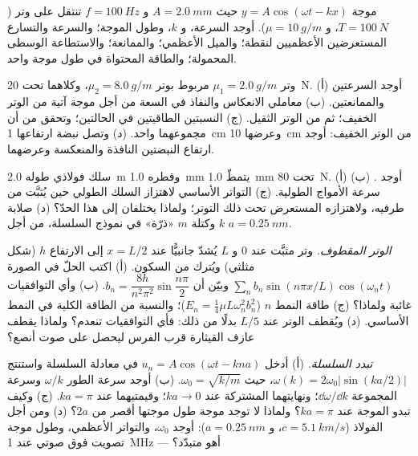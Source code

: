 \begin{exercise}[$\star\star$]\label{exo:b2:waves-on-strings:7}
موجة $y = A\cos(\omega t - kx)$ حيث $A = \qty{2.0}{mm}$ و $f = \qty{100}{Hz}$
تنتقل على وتر ($T = \qty{100}{N}$، و $\mu = \qty{10}{g/m}$). أوجد السرعة، و $k$،
وطول الموجة؛ والسرعة والتسارع المستعرضين الأعظميين لنقطة؛
والميل الأعظمي؛ والممانعة؛ والاستطاعة الوسطى المحمولة؛ والطاقة
المحتواة في طول موجة واحد.
\end{exercise}

\begin{exercise}[$\star\star$]\label{exo:b2:waves-on-strings:8}
وتر $\mu_1 = \qty{2.0}{g/m}$ مربوط بوتر $\mu_2 = \qty{8.0}{g/m}$،
وكلاهما تحت \qty{20}{N}. (أ) أوجد السرعتين والممانعتين. (ب) معاملي
الانعكاس والنفاذ في السعة من أجل موجة آتية من الوتر
الخفيف؛ ثم من الوتر الثقيل. (ج) النسبتين الطاقيتين في الحالتين؛
وتحقق من أن مجموعهما واحد. (د) وتصل نبضة ارتفاعها \qty{1}{cm} وعرضها \qty{10}{cm}
من الوتر الخفيف: أوجد ارتفاع النبضتين النافذة والمنعكسة وعرضهما.
\end{exercise}

\begin{exercise}[$\star\star$]\label{exo:b2:waves-on-strings:9}
سلك فولاذي طوله \qty{2.0}{m} وقطره \qty{1.0}{mm} يتمطّ \qty{1.0}{mm}
تحت \qty{80}{N}. (أ) أوجد . (ب) سرعة الأمواج الطولية.
(ج) التواتر الأساسي لاهتزاز السلك الطولي حين يُثبَّت من
طرفيه، ولاهتزازه المستعرض تحت ذلك التوتر؛ ولماذا يختلفان إلى
هذا الحدّ؟ (د) صلابة $k$ وكتلة $m$ «ذرّة» في نموذج السلسلة،
من أجل $a = \qty{0.25}{nm}$.
\end{exercise}

\begin{exercise}[$\star\star\star$]\label{exo:b2:waves-on-strings:10}
\emph{الوتر المقطوف.} وتر مثبَّت عند $0$ و $L$ يُشدّ جانبيًّا
عند $x = L/2$ إلى الارتفاع $h$ (شكل مثلثي) ويُترك من السكون.
(أ) اكتب الحلّ في الصورة $\sum_nb_n\sin(n\pi x/L)\cos(\omega_nt)$ وبيّن
أن $b_n = \dfrac{8h}{n^2\pi^2}\sin\dfrac{n\pi}2$. (ب) وأي التوافقيات
غائبة ولماذا؟ (ج) طاقة النمط $n$ ($E_n = \tfrac14\mu L\omega_n^2b_n^2$)؛
والنسبة من الطاقة الكلية في النمط الأساسي. (د) ويُقطف الوتر عند
$L/5$ بدلًا من ذلك: فأي التوافقيات تنعدم؟ ولماذا يقطف عازف القيثارة
قرب الفرس ليحصل على صوت أنصع؟
\end{exercise}

\begin{exercise}[$\star\star\star$]\label{exo:b2:waves-on-strings:11}
\emph{تبدد السلسلة.} (أ) أدخل $u_n = A\cos(\omega t - kna)$ في
معادلة السلسلة واستنتج $\omega(k) = 2\omega_0|\sin(ka/2)|$، حيث $\omega_0 =
\sqrt{k/m}$. (ب) أوجد سرعة الطور $\omega/k$ وسرعة المجموعة $\dd\omega/\dd k$؛
ونهايتهما المشتركة عند $ka \to 0$؛ وقيمتيهما عند $ka = \pi$. (ج) وكيف
تبدو الموجة عند $ka = \pi$؟ ولماذا لا توجد موجة طول موجتها
أقصر من $2a$؟ (د) ومن أجل الفولاذ ($c = \qty{5.1}{km/s}$، و $a =
\qty{0.25}{nm}$): أوجد $\omega_0$، والتواتر الأعظمي، وطول موجة
تصويت فوق صوتي عند \qty{1}{MHz} --- أهو متبدّد؟
\end{exercise}

